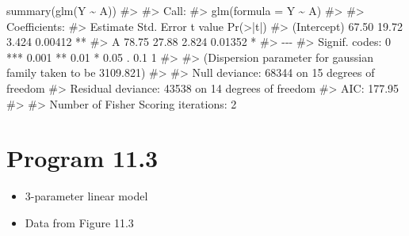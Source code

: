 \documentclass[
  10pt,
  a4paper,
]{book}
\newenvironment{Shaded}{\begin{snugshade}}{\end{snugshade}}
\newcommand{\CommentTok}[1]{\textcolor[rgb]{0.37,0.37,0.37}{#1}}
\newcommand{\FunctionTok}[1]{\textcolor[rgb]{0.28,0.35,0.67}{#1}}
\newcommand{\NormalTok}[1]{\textcolor[rgb]{0.00,0.46,0.62}{#1}}
\newcommand{\SpecialCharTok}[1]{\textcolor[rgb]{0.37,0.37,0.37}{#1}}
\providecommand{\tightlist}{%
  \setlength{\itemsep}{0pt}\setlength{\parskip}{0pt}}
\begin{document}
\begin{Shaded}
\begin{Highlighting}[]
\FunctionTok{summary}\NormalTok{(}\FunctionTok{glm}\NormalTok{(Y }\SpecialCharTok{\textasciitilde{}}\NormalTok{ A))}
\CommentTok{\#\textgreater{} }
\CommentTok{\#\textgreater{} Call:}
\CommentTok{\#\textgreater{} glm(formula = Y \textasciitilde{} A)}
\CommentTok{\#\textgreater{} }
\CommentTok{\#\textgreater{} Coefficients:}
\CommentTok{\#\textgreater{}             Estimate Std. Error t value Pr(\textgreater{}|t|)   }
\CommentTok{\#\textgreater{} (Intercept)    67.50      19.72   3.424  0.00412 **}
\CommentTok{\#\textgreater{} A              78.75      27.88   2.824  0.01352 * }
\CommentTok{\#\textgreater{} {-}{-}{-}}
\CommentTok{\#\textgreater{} Signif. codes:  0 \textquotesingle{}***\textquotesingle{} 0.001 \textquotesingle{}**\textquotesingle{} 0.01 \textquotesingle{}*\textquotesingle{} 0.05 \textquotesingle{}.\textquotesingle{} 0.1 \textquotesingle{} \textquotesingle{} 1}
\CommentTok{\#\textgreater{} }
\CommentTok{\#\textgreater{} (Dispersion parameter for gaussian family taken to be 3109.821)}
\CommentTok{\#\textgreater{} }
\CommentTok{\#\textgreater{}     Null deviance: 68344  on 15  degrees of freedom}
\CommentTok{\#\textgreater{} Residual deviance: 43538  on 14  degrees of freedom}
\CommentTok{\#\textgreater{} AIC: 177.95}
\CommentTok{\#\textgreater{} }
\CommentTok{\#\textgreater{} Number of Fisher Scoring iterations: 2}
\end{Highlighting}
\end{Shaded}

\section{Program 11.3}\label{program-11.3}

\begin{itemize}
\tightlist
\item
  3-parameter linear model
\item
  Data from Figure 11.3
\end{itemize}
\end{document}
